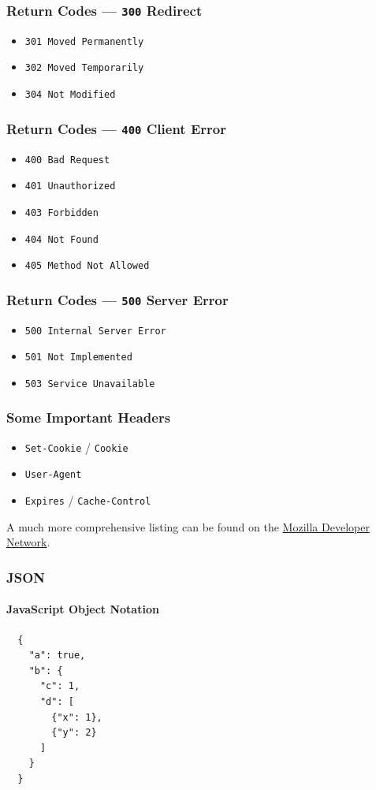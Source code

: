 \documentclass[dvipsnames]{beamer}
\begin{document}
\begin{frame}
  \frametitle{Return Codes --- \texttt{300} Redirect}
  \begin{itemize}
    \item \texttt{301 Moved Permanently}
    \item \texttt{302 Moved Temporarily}
    \item \texttt{304 Not Modified}
  \end{itemize}
\end{frame}


\begin{frame}
  \frametitle{Return Codes --- \texttt{400} Client Error}
  \begin{itemize}
    \item \texttt{400 Bad Request}
    \item \texttt{401 Unauthorized}
    \item \texttt{403 Forbidden}
    \item \texttt{404 Not Found}
    \item \texttt{405 Method Not Allowed}
  \end{itemize}
\end{frame}


\begin{frame}
  \frametitle{Return Codes --- \texttt{500} Server Error}
  \begin{itemize}
    \item \texttt{500 Internal Server Error}
    \item \texttt{501 Not Implemented}
    \item \texttt{503 Service Unavailable}
  \end{itemize}
\end{frame}


\begin{frame}
  \frametitle{Some Important Headers}
  \begin{itemize}
    \item \texttt{Set-Cookie} / \texttt{Cookie}
    \item \texttt{User-Agent}
    \item \texttt{Expires} / \texttt{Cache-Control}
  \end{itemize}

  A much more comprehensive listing can be found on the \href{https://developer.mozilla.org/en-US/docs/Web/HTTP/Headers}{Mozilla Developer Network}.
\end{frame}


\begin{frame}[fragile=singleslide]
  \frametitle{JSON}
  \framesubtitle{JavaScript Object Notation}
  \begin{Verbatim}
  {
    "a": true,
    "b": {
      "c": 1,
      "d": [
        {"x": 1},
        {"y": 2}
      ]
    }
  }
	\end{Verbatim}
\end{frame}
\end{document}
